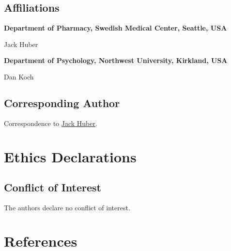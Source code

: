 \documentclass[
]{article}
\newlength{\cslhangindent}
\newlength{\cslentryspacingunit} %
\newenvironment{CSLReferences}[2] %
 {%
  \setlength{\parindent}{0pt}
  \ifodd #1
  \let\oldpar\par
  \def\par{\hangindent=\cslhangindent\oldpar}
  \fi
  \setlength{\parskip}{#2\cslentryspacingunit}
 }%
 {}
\begin{document}
\hypertarget{affiliations}{%
\subsection{Affiliations}\label{affiliations}}

\textbf{Department of Pharmacy, Swedish Medical Center, Seattle, USA}

Jack Huber

\textbf{Department of Psychology, Northwest University, Kirkland, USA}

Dan Koch

\hypertarget{corresponding-author}{%
\subsection{Corresponding Author}\label{corresponding-author}}

Correspondence to \href{mailto:jack.bernard.huber@gmail.com}{Jack Huber}.

\hypertarget{ethics-declarations}{%
\section{Ethics Declarations}\label{ethics-declarations}}

\hypertarget{conflict-of-interest}{%
\subsection{Conflict of Interest}\label{conflict-of-interest}}

The authors declare no conflict of interest.

\hypertarget{references}{%
\section*{References}\label{references}}

\hypertarget{refs}{}
\begin{CSLReferences}{0}{0}
\end{CSLReferences}

  
\end{document}
